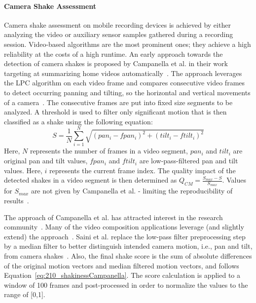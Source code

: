 \paragraph{Camera Shake Assessment}
Camera shake assessment on mobile recording devices is achieved by either analyzing the video or auxiliary sensor samples gathered during a recording session.
Video-based algorithms are the most prominent ones; they achieve a high reliability at the costs of a high runtime.
An early approach towards the detection of camera shakes is proposed by Campanella et al. in their work targeting at summarizing home videos automatically~\cite{Campanella2007}. 
The approach leverages the  \ac{LPC} algorithm on each video frame and compares consecutive video frames to detect occurring panning and tilting, so the horizontal and vertical movements of a camera~\cite{Nagasaka1999,Uehara2004}.
The consecutive frames are put into fixed size segments to be analyzed.
A threshold is used to filter only significant motion that is then classified as a shake using the following equation: 
\begin{equation} \label{eq:210_shakinessCampanella}
  \textit{S} = \frac{1}{N} \displaystyle\sum_{i=1}^{N} \sqrt{(pan_i - fpan_i)^2 + (tilt_i - ftilt_i)^2}
\end{equation}
Here, $N$ represents the number of frames in a video segment, $pan_i$ and $tilt_i$ are original pan and tilt values, $fpan_i$ and $ftilt_i$ are low-pass-filtered pan and tilt values. Here, $i$ represents the current frame index.
The quality impact of the detected shakes in a video segment is then determined as $Q_{CM} = \frac{S_{max}-S}{S_{max}}$.
Values for $S_{max}$ are not given by Campanella et al. - limiting the reproducibility of results~\cite{Campanella2007}.

The approach of Campanella et al. has attracted interest in the research community~\cite{Campanella2007}. 
Many of the video composition applications leverage (and slightly extend) the approach~\cite{Bano2015b,Saini2012,Shrestha2010}.
Saini et al. replace the low-pass filter preprocessing step by a median filter to better distinguish intended camera motion, i.e., pan and tilt, from camera shakes~\cite{Saini2012}.
Also, the final shake score is the sum of absolute differences of the original motion vectors and median filtered motion vectors, and follows Equation~\ref{eq:210_shakinessCampanella}. 
The score calculation is applied to a window of 100 frames and post-processed in order to normalize the values to the range of [0,1].

